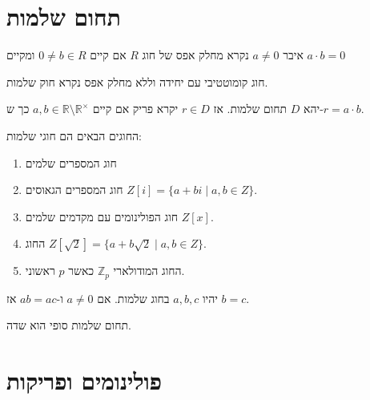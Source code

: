 \documentclass{tstextbook}
\begin{document}
\section{תחום שלמות}

\begin{definition}
איבר \(a\neq 0\) נקרא מחלק אפס של חוג \(R\) אם קיים \(0\neq b \in R\) ומקיים \(a\cdot b =0\)

\end{definition}
\begin{definition}
חוג קומוטטיבי עם יחידה וללא מחלק אפס נקרא חוק שלמות.

\end{definition}
\begin{definition}[פריקות]
יהא \(D\) תחום שלמות. אז \(r \in D\) יקרא פריק אם קיים \(a,b \in \mathbb{R} \setminus \mathbb{R}^\times\) כך ש-\(r=a\cdot b\).

\end{definition}
\begin{example}
החוגים הבאים הם חוגי שלמות:

  \begin{enumerate}
    \item חוג המספרים שלמים 


    \item חוג המספרים הגאוסים \(Z[i]=\{a+b i\mid a,b\in Z\}\). 


    \item חוג הפולינומים עם מקדמים שלמים \(Z[x]\). 


    \item החוג \(Z[{\sqrt{2}}]=\{a+b{\sqrt{2}}\mid a,b\in Z\}\). 


    \item החוג המודולארי \(\mathbb{Z}_{p}\) כאשר \(p\) ראשוני. 


  \end{enumerate}
\end{example}
\begin{proposition}
יהיו \(a,b,c\) בחוג שלמות. אם \(a\neq 0\) ו-\(ab=ac\) אז \(b=c\).

\end{proposition}
\begin{proposition}
תחום שלמות סופי הוא שדה.

\end{proposition}

\section{פולינומים ופריקות}
\end{document}

